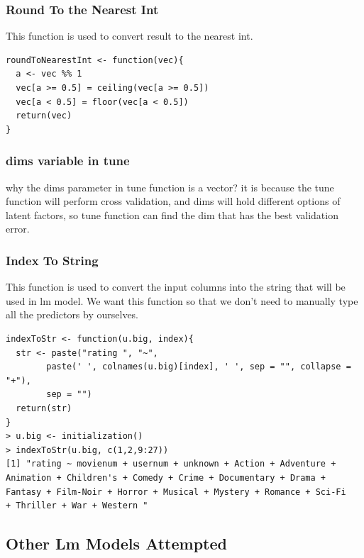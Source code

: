 \documentclass[11pt]{article}
\begin{document}
\subsubsection{Round To the Nearest Int}
This function is used to convert result to the nearest int.
\begin{verbatim}
roundToNearestInt <- function(vec){
  a <- vec %% 1
  vec[a >= 0.5] = ceiling(vec[a >= 0.5])
  vec[a < 0.5] = floor(vec[a < 0.5])
  return(vec)
}
\end{verbatim}
\subsubsection{dims variable in tune}
why the dims parameter in tune function is a vector? it is because the tune function will perform cross validation,
and dims will hold different options of  latent factors, so tune function can find the dim that has the best validation error.

\subsubsection{Index To String}
This function is used to convert the input columns into the string
that will be used in lm model. We want this function so that we don't need to manually type all the predictors by ourselves.
\begin{verbatim}
indexToStr <- function(u.big, index){
  str <- paste("rating ", "~",
        paste(' ', colnames(u.big)[index], ' ', sep = "", collapse = "+"),
        sep = "")
  return(str)
}
> u.big <- initialization()
> indexToStr(u.big, c(1,2,9:27))
[1] "rating ~ movienum + usernum + unknown + Action + Adventure + 
Animation + Children's + Comedy + Crime + Documentary + Drama + 
Fantasy + Film-Noir + Horror + Musical + Mystery + Romance + Sci-Fi 
+ Thriller + War + Western "
\end{verbatim}

\subsection{Other Lm Models Attempted}
\end{document}

